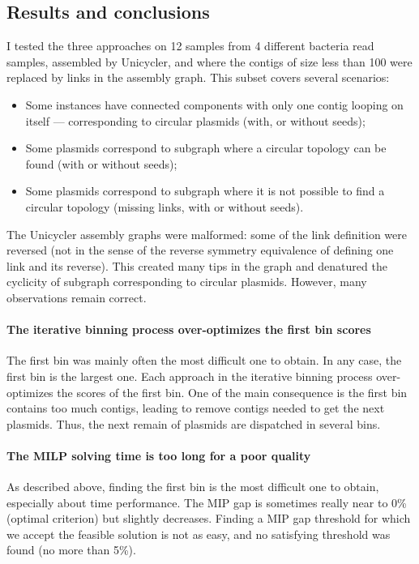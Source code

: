 \subsection{Results and conclusions}\label{sec:pbf_iterbin:conclusions}

I tested the three approaches on 12 samples from 4 different bacteria read samples, assembled by Unicycler, and where the contigs of size less than 100 were replaced by links in the assembly graph.
This subset covers several scenarios:

\begin{itemize}
  \item Some instances have connected components with only one contig looping on itself --- corresponding to circular plasmids (with, or without seeds);
  \item Some plasmids correspond to subgraph where a circular topology can be found (with or without seeds);
  \item Some plasmids correspond to subgraph where it is not possible to find a circular topology (missing links, with or without seeds).
\end{itemize}

\begin{warningbox}
  The Unicycler assembly graphs were malformed: some of the link definition were reversed (not in the sense of the reverse symmetry equivalence of defining one link and its reverse).
  This created many tips in the graph and denatured the cyclicity of subgraph corresponding to circular plasmids.
  However, many observations remain correct.
\end{warningbox}

\paragraph{The iterative binning process over-optimizes the first bin scores}
The first bin was mainly often the most difficult one to obtain.
In any case, the first bin is the largest one.
Each approach in the iterative binning process over-optimizes the scores of the first bin.
One of the main consequence is the first bin contains too much contigs, leading to remove contigs needed to get the next plasmids.
Thus, the next remain of plasmids are dispatched in several bins.

\paragraph{The MILP solving time is too long for a poor quality}
As described above, finding the first bin is the most difficult one to obtain, especially about time performance.
The MIP gap is sometimes really near to 0\% (optimal criterion) but slightly decreases.
Finding a MIP gap threshold for which we accept the feasible solution is not as easy, and no satisfying threshold was found (no more than 5\%).

